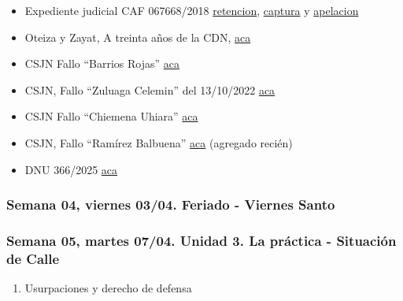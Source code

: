 \documentclass[
]{article}
\providecommand{\tightlist}{%
  \setlength{\itemsep}{0pt}\setlength{\parskip}{0pt}}
\begin{document}
\begin{itemize}
\item
  Expediente judicial CAF 067668/2018
  \href{https://drive.google.com/file/d/1MszNbvuQgl56ukSCbql4ggAAKyiia5Bs/view?usp=sharing}{retencion},
  \href{https://drive.google.com/file/d/11RSJ0lXuMKwhQy-gVHfODbc-AH1fBE0j/view?usp=sharing}{captura}
  y
  \href{https://drive.google.com/file/d/1xsXyT2y3F7sGL8yhK8kG6GTfhkYi7nVw/view?usp=sharing}{apelacion}
\item
  Oteiza y Zayat, A treinta años de la CDN,
  \href{https://drive.google.com/file/d/1rZbIfh3834THG1K07moFq1Cgp_zmYtsk/view?usp=sharing}{aca}
\item
  CSJN Fallo ``Barrios Rojas''
  \href{https://drive.google.com/file/d/15DQUBVIVb6feRRGwkksVgjZT9qRLTdOL/view?usp=sharing}{aca}
\item
  CSJN, Fallo ``Zuluaga Celemin'' del 13/10/2022
  \href{https://drive.google.com/file/d/1B0sp1vdW7HV6fYlQxB1nLoCG4GXRYcR8/view?usp=sharing}{aca}
\item
  CSJN Fallo ``Chiemena Uhiara''
  \href{https://drive.google.com/file/d/1m4EdxUp68KgqEPfTHjRH59QR_IDpFAk5/view?usp=sharing}{aca}
\item
  CSJN, Fallo ``Ramírez Balbuena''
  \href{https://drive.google.com/file/d/1Ywkky3GM7QkgfrJzKadus-wxZKdKI1aj/view?usp=sharing}{aca}
  (agregado recién)
\item
  DNU 366/2025
  \href{https://servicios.infoleg.gob.ar/infolegInternet/anexos/410000-414999/413297/norma.htm}{aca}
\end{itemize}

\subsubsection{\texorpdfstring{{Semana 04, viernes 03/04. Feriado -
Viernes
Santo}}{Semana 04, viernes 03/04. Feriado - Viernes Santo}}\label{semana-04-viernes-0304.-feriado---viernes-santo}

\subsubsection{Semana 05, martes 07/04. Unidad 3. La práctica -
Situación de
Calle}\label{semana-05-martes-0704.-unidad-3.-la-pruxe1ctica---situaciuxf3n-de-calle}

\begin{enumerate}
\def\labelenumi{\alph{enumi}.}
\setcounter{enumi}{1}
\tightlist
\item
  Usurpaciones y derecho de defensa
\end{enumerate}
\end{document}
